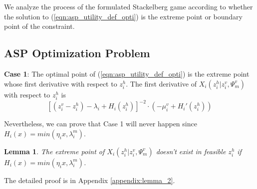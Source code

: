 \documentclass[10pt,journal, compsoc]{IEEEtran}
\newtheorem{lemma}{Lemma}
\begin{document}
We analyze the process of the formulated Stackelberg game according to whether the solution to (\ref{eqn:asp_utility_def_opti}) is the extreme point or boundary point of the constraint.

\subsection{ASP Optimization Problem}
\textbf{Case 1}: The optimal point of (\ref{eqn:asp_utility_def_opti}) is the extreme point whose first derivative with respect to $z_i^h$. The first derivative of $X_i(z_i^h|z_i^v,\Psi_m^v)$ with respect to $z_i^h$ is
\begin{equation} \label{eqn:asp_utilitu_def_firstderiv}
[(z_i^v - z_i^h) - \lambda_i + H_i(z_i^h)]^{-2} \cdot (-\mu_i^v + H_i'(z_i^h))
\end{equation}


Nevertheless, we can prove that Case 1 will never happen since $H_i(x) = min(\eta_i{x}, \lambda_i^m)$. %
\begin{lemma} \label{lemma:asp_case1_not_exist}
The extreme point of $X_i(z_i^h|z_i^v,\Psi_m^v)$ doesn't exist in feasible $z_i^h$ if $H_i(x) = min(\eta_i{x}, \lambda_i^m)$.
\end{lemma}
The detailed proof is in Appendix \ref{appendix:lemma_2}.
\end{document}
